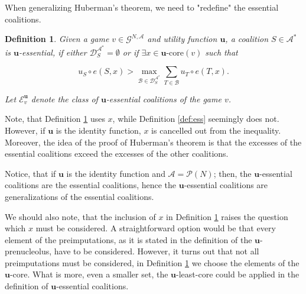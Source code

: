 \documentclass[a4paper,12pt]{article}
\newtheorem{definition}[theorem]{Definition}
\theoremstyle{definition}
\theoremstyle{remark}
\begin{document}

When generalizing Huberman's theorem, we need to "redefine" the essential coalitions. %

\begin{definition}\label{def:u-ess}
Given a game $v \in \mathcal{G}^{N, \mathcal{A}}$ and utility function $\mathbf{u}$, a coalition $S \in \mathcal{A}^{\ast}$ is \textit{$\mathbf{u}$-essential}, if either $\mathcal{D}_S^{\mathcal{A}^{\ast}} = \emptyset $ or if $\exists x\in \mathbf{u}\text{-core}(v)$ such that

\begin{equation*}
u_S \circ e(S, x) > \max \limits_{\mathcal{B} \in \mathcal{D}_S^{\mathcal{A}^{\ast}}} \sum_{T \in \mathcal{B}} u_T \circ e(T, x) .
\end{equation*}

Let $\mathcal{E}_v^{\mathbf{u}}$ denote the class of $\mathbf{u}$-essential coalitions of the game $v$.
\end{definition}

Note, that Definition \ref{def:u-ess} uses $x$, while Definition \ref{def:ess} seemingly does not. However, if $\mathbf{u}$ is the identity function, $x$ is cancelled out from the inequality. Moreover, the idea of the proof of Huberman's theorem is that the excesses of the essential coalitions exceed the excesses of the other coalitions. %

Notice, that if $\mathbf{u}$ is the identity function and $\mathcal{A} = \mathcal{P}(N)$; then, the $\mathbf{u}$-essential coalitions are the essential coalitions, hence the $\mathbf{u}$-essential coalitions are generalizations of the essential coalitions.

We should also note, that the inclusion of $x$ in Definition \ref{def:u-ess} raises the question which $x$ must be considered. A straightforward option would be that every element of the preimputations, as it is stated in the definition of the $\mathbf{u}$-prenucleolus, have to be considered. However, it turns out that not all preimputations must be considered, in Definition \ref{def:u-ess} we choose the elements of the $\mathbf{u}$-core. What is  more, even a smaller set, the $\mathbf{u}$-least-core could be applied in the definition of $\mathbf{u}$-essential coalitions. 
\end{document}
